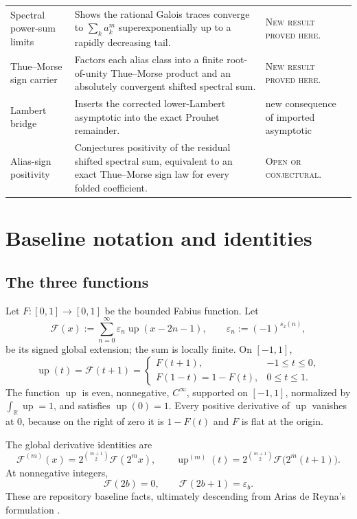 \documentclass[11pt,oneside]{article}
\theoremstyle{definition}
\theoremstyle{remark}
\newcommand{\R}{\mathbb R}
\newcommand{\Up}{\operatorname{up}}
\newcommand{\eps}{\varepsilon}
\newcommand{\GF}{\mathcal F}
\newcommand{\newresult}{\textcolor{newgreen}{\textsc{New result proved here.}}}
\newcommand{\openstatus}{\textcolor{conjectureorange}{\textsc{Open or conjectural.}}}
\begin{document}
{\begin{longtable}{@{}>{\raggedright\arraybackslash}p{}>{\raggedright\arraybackslash}p{}>{\raggedright\arraybackslash}p{}@{}}
Spectral power-sum limits & Shows the rational Galois traces converge to $\sum_k a_k^m$ superexponentially up to a rapidly decreasing tail. & \newresult \\
Thue--Morse sign carrier & Factors each alias class into a finite root-of-unity Thue--Morse product and an absolutely convergent shifted spectral sum. & \newresult \\
Lambert bridge & Inserts the corrected lower-Lambert asymptotic into the exact Prouhet remainder. & new consequence of imported asymptotic \\
Alias-sign positivity & Conjectures positivity of the residual shifted spectral sum, equivalent to an exact Thue--Morse sign law for every folded coefficient. & \openstatus \\
\end{longtable}
}

\section{Baseline notation and identities}\label{sec:baseline}

\subsection{The three functions}

Let $F:[0,1]\to[0,1]$ be the bounded Fabius function.  Let
\begin{equation}\label{eq:global-F}
 \GF(x):=\sum_{n=0}^{\infty}\eps_n\Up(x-2n-1),
 \qquad \eps_n:=(-1)^{s_2(n)},
\end{equation}
be its signed global extension; the sum is locally finite.  On $[-1,1]$,
\begin{equation}\label{eq:Up-F-relations}
 \Up(t)=\GF(t+1)=
 \begin{cases}
  F(t+1),&-1\le t\le0,\\
  F(1-t)=1-F(t),&0\le t\le1.
 \end{cases}
\end{equation}
The function $\Up$ is even, nonnegative, $C^\infty$, supported on $[-1,1]$,
normalized by $\int_{\R}\Up=1$, and satisfies $\Up(0)=1$.
Every positive derivative of $\Up$ vanishes at $0$, because on the right of
zero it is $1-F(t)$ and $F$ is flat at the origin.

The global derivative identities are
\begin{equation}\label{eq:global-derivatives}
 \GF^{(m)}(x)=2^{\binom{m+1}{2}}\GF(2^m x),
 \qquad
 \Up^{(m)}(t)=2^{\binom{m+1}{2}}\GF\bigl(2^m(t+1)\bigr).
\end{equation}
At nonnegative integers,
\begin{equation}\label{eq:global-integers}
 \GF(2b)=0,
 \qquad
 \GF(2b+1)=\eps_b.
\end{equation}
These are repository baseline facts, ultimately descending from Arias de Reyna's
formulation \cite{ariascompact,ariasarith}.
\end{document}
